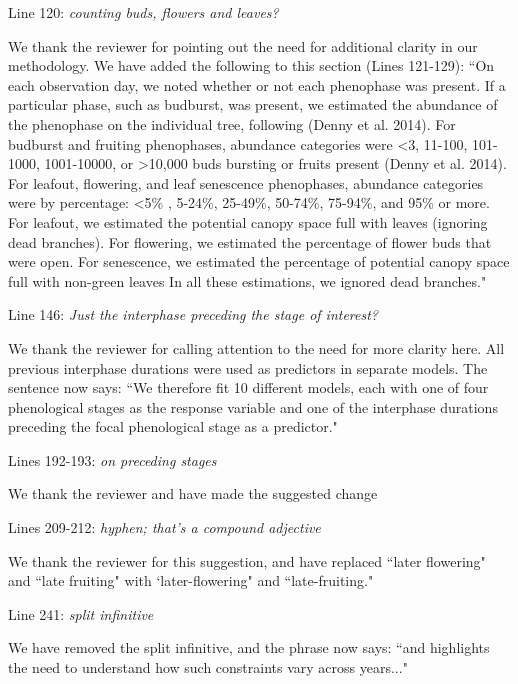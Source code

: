 \documentclass[10.95pt,a4paper]{letter}
\begin{document}
\par Line 120: \emph{counting buds, flowers and leaves?}

\par We thank the reviewer for pointing out the need for additional clarity in our methodology. We have added the following to this section (Lines 121-129): ``On each observation day, we noted whether or not each phenophase was present. If a particular phase, such as budburst, was present, we estimated the abundance of the phenophase on the individual tree, following (Denny et al. 2014). For budburst and fruiting phenophases, abundance categories were \textless 3, 11-100, 101-1000, 1001-10000, or \textgreater 10,000 buds bursting or fruits present (Denny et al. 2014). For leafout, flowering, and leaf senescence phenophases, abundance categories were by percentage: \textless 5\% , 5-24\%, 25-49\%, 50-74\%, 75-94\%, and 95\%  or more. For leafout, we estimated the potential canopy space full with leaves (ignoring dead branches). For flowering, we estimated the percentage of flower buds that were open. For senescence, we estimated the percentage of potential canopy space full with non-green leaves In all these estimations, we ignored dead branches."

\par Line 146:  \emph{Just the interphase preceding the stage of interest?}
\par We thank the reviewer for calling attention to the need for more clarity here. All previous interphase durations were used as predictors in separate models. The sentence now says:
``We therefore fit 10 different models, each with one of four phenological stages as the response variable and one of the interphase durations preceding the focal phenological stage as a predictor."

\par Lines 192-193: \emph{on preceding stages}
\par We thank the reviewer and have made the suggested change
 
\par Lines 209-212: \emph{hyphen; that's a compound adjective}
\par We thank the reviewer for this suggestion, and have replaced ``later flowering" and ``late fruiting" with `later-flowering" and ``late-fruiting." 

\par Line 241: \emph{split infinitive}
\par We have removed the split infinitive, and the phrase now says: ``and highlights the need to understand how such constraints vary across years..."
\end{document}
